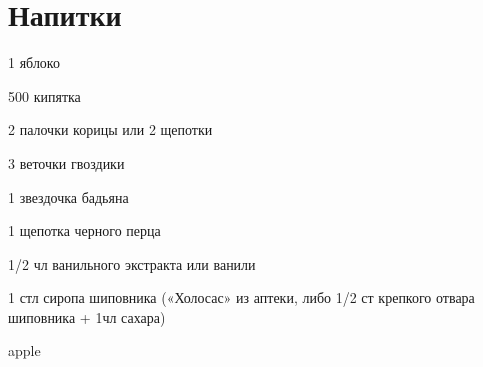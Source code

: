 \chapter*{Напитки}
\label{sec:drinks}


\recipe{}{}{}
{
\item 
}{
\item 
}{
}{}{}





{
\item 1 яблоко
\item 500 кипятка
\item 2 палочки корицы или 2 щепотки
\item 3 веточки гвоздики
\item 1 звездочка бадьяна
\item 1 щепотка черного перца
\item 1/2 чл ванильного экстракта или ванили
\item 1 стл сиропа шиповника («Холосас» из аптеки, либо 1/2 ст крепкого отвара шиповника + 1чл сахара)

}{
\item 
}{%
}{}{apple}




\recipe{}{}{}
{
\item 
}{
\item 
}{
}{}{}

\recipe{}{}{}
{
\item 
}{
\item 
}{
}{}{}

\recipe{}{}{}
{
\item 
}{
\item 
}{
}{}{}
